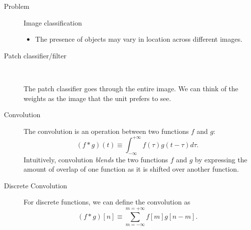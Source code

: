\documentclass[10pt,landscape,a4paper]{article}
\begin{document}
\begin{multicols*}{3}
\begin{description}
	\item[Problem] Image classification
	\begin{itemize}
		\item The presence of objects may vary in location across different images.
	\end{itemize}
	\item[Patch classifier/filter] ~
	\begin{center}
	\end{center}
	The patch classifier goes through the entire image. We can think of the weights as the image that the unit prefers to see.
	\item[Convolution] The convolution is an operation between two functions $f$ and $g$:
	$$\left(f*g\right)(t)\equiv\int_{-\infty}^{+\infty}f(\tau)g(t-\tau)d\tau.$$
	Intuitively, convolution {\it blends} the two functions $f$ and $g$ by expressing the amount of overlap of one function as it is shifted over another function.
	\item[Discrete Convolution] For discrete functions, we can define the convolution as
	$$\left(f*g\right)[n]\equiv\sum_{m=-\infty}^{m=+\infty}f[m]g[n-m].$$

\end{description}
\end{multicols*}
\end{document}
